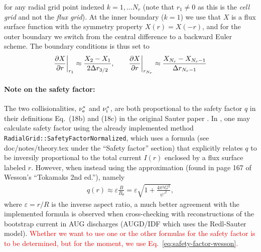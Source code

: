 \documentclass{notes}
\newcommand{\nui}{\nu_{\rm i}^*}
\newcommand{\nue}{\nu_{\rm e}^*}
\begin{document}
    for any radial grid point indexed $k=1,\dots N_r$ (note that $r_1\neq0$ as this is the \textit{cell grid} and not the \textit{flux grid}).
    At the inner boundary ($k=1$) we use that $X$ is a flux surface function with the symmetry property $X(r)=X(-r)$, and for the outer boundary we switch from the central difference to a backward Euler scheme.
    The boundary conditions is thus set to
    \begin{align}
        \pdv{X}{r}\bigg|_{r_1}
            \approx\frac{X_{2}-X_1}{2\Delta r_{3/2}},\qquad
        \pdv{X}{r}\bigg|_{r_{N_r}}
            \approx\frac{X_{N_r}-X_{N_r-1}}{\Delta r_{N_r-1}}
    \end{align}

    \paragraph{Note on the safety factor:}
    The two collisionalities, $\nue$ and $\nui$, are both proportional to the safety factor $q$ in their definitions Eq.~(18b) and (18c) in the original Sauter paper \cite{Sauter1999}.
    In \DREAM, one may calculate safety factor using the already implemented method \texttt{RadialGrid::SafetyFactorNormalized}, which uses a formula (see doc/notes/theory.tex under the ``Safety factor'' section) that explicitly relates $q$ to be inversily proportional to the total current $I(r)$ enclosed by a flux surface labeled $r$.
    However, when instead using the approximation (found in page 167 of Wesson's ``Tokamaks 2nd ed.''), namely
    \begin{align}
        \label{eq:safety-factor-wesson}
        q(r)\approx\varepsilon\frac{B}{B_\theta}=\varepsilon\sqrt{1+\frac{4\pi^2G^2}{\psi'^2}},
    \end{align}
    where $\varepsilon= r/R$ is the inverse aspect ratio, a much better agreement with the implemented formula is observed when cross-checking with reconstructions of the bootstrap current in AUG discharges (AUGD/IDF which uses the Redl-Sauter model).
    \textcolor{red}{Whether we want to use one or the other formulas for the safety factor is to be determined, but for the moment, we use Eq.~\eqref{eq:safety-factor-wesson}.}

    \printbibliography
\end{document}
